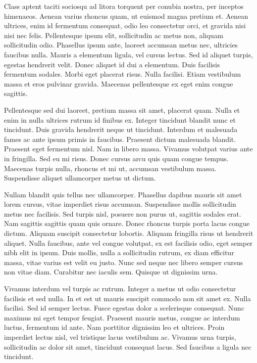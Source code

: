 Class aptent taciti sociosqu ad litora torquent per conubia nostra, per inceptos himenaeos. Aenean varius rhoncus quam, ut euismod magna pretium et. Aenean ultrices, enim id fermentum consequat, odio leo consectetur orci, et gravida nisi nisi nec felis. Pellentesque ipsum elit, sollicitudin ac metus non, aliquam sollicitudin odio. Phasellus ipsum ante, laoreet accumsan metus nec, ultricies faucibus nulla. Mauris a elementum ligula, vel cursus lectus. Sed id aliquet turpis, egestas hendrerit velit. Donec aliquet id dui a elementum. Duis facilisis fermentum sodales. Morbi eget placerat risus. Nulla facilisi. Etiam vestibulum massa et eros pulvinar gravida. Maecenas pellentesque ex eget enim congue sagittis.

Pellentesque sed dui laoreet, pretium massa sit amet, placerat quam. Nulla et enim in nulla ultrices rutrum id finibus ex. Integer tincidunt blandit nunc et tincidunt. Duis gravida hendrerit neque ut tincidunt. Interdum et malesuada fames ac ante ipsum primis in faucibus. Praesent dictum malesuada blandit. Praesent eget fermentum nisl. Nam in libero massa. Vivamus volutpat varius ante in fringilla. Sed eu mi risus. Donec cursus arcu quis quam congue tempus. Maecenas turpis nulla, rhoncus et mi ut, accumsan vestibulum massa. Suspendisse aliquet ullamcorper metus ut dictum.

Nullam blandit quis tellus nec ullamcorper. Phasellus dapibus mauris sit amet lorem cursus, vitae imperdiet risus accumsan. Suspendisse mollis sollicitudin metus nec facilisis. Sed turpis nisl, posuere non purus ut, sagittis sodales erat. Nam sagittis sagittis quam quis ornare. Donec rhoncus turpis porta lacus congue dictum. Aliquam suscipit consectetur lobortis. Aliquam fringilla risus ut hendrerit aliquet. Nulla faucibus, ante vel congue volutpat, ex est facilisis odio, eget semper nibh elit in ipsum. Duis mollis, nulla a sollicitudin rutrum, ex diam efficitur massa, vitae varius est velit eu justo. Nunc sed neque nec libero semper cursus non vitae diam. Curabitur nec iaculis sem. Quisque ut dignissim urna.

Vivamus interdum vel turpis ac rutrum. Integer a metus ut odio consectetur facilisis et sed nulla. In et est ut mauris suscipit commodo non sit amet ex. Nulla facilisi. Sed id semper lectus. Fusce egestas dolor a scelerisque consequat. Nunc maximus mi eget tempor feugiat. Praesent mauris metus, congue ac interdum luctus, fermentum id ante. Nam porttitor dignissim leo et ultrices. Proin imperdiet lectus nisl, vel tristique lacus vestibulum ac. Vivamus urna turpis, sollicitudin ac dolor sit amet, tincidunt consequat lacus. Sed faucibus a ligula nec tincidunt.

